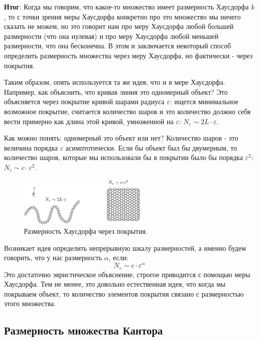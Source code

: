 \documentclass[12pt]{article}
\newcommand{\VE}{\varepsilon}
\theoremstyle{definition}
\begin{document}
\textbf{Итог}: Когда мы говорим, что какое-то множество имеет размерность Хаусдорфа $k$, то с точки зрения меры Хаусдорфа конкретно про это множество мы ничего сказать не можем, но это говорит нам про меру Хаусдорфа любой большей размерности (что она нулевая) и про меру Хаусдорфа любой меньшей размерности, что она бесконечна. В этом и заключается некоторый способ определить размерность множества через меру Хаусдорфа, но фактически - через покрытия. 

Таким образом, опять используется та же идея, что и в мере Хаусдорфа. Например, как объяснить, что кривая линия это одномерный объект? Это объясняется через покрытие кривой шарами радиуса $\VE$: ищется минимальное возможное покрытие, считается количество шаров и это количество должно себя вести примерно как длина этой кривой, умноженной на $\VE$: $N_\VE \sim 2 L{\cdot}\VE$.

Как можно понять: одномерный это объект или нет? Количество шаров - это величина порядка $\VE$ асимптотически. Если бы объект был бы двумерным, то количество шаров, которые мы использовали бы в покрытии было бы порядка $\VE^2$: $N_\VE \sim c{\cdot}\VE^2$.

\begin{figure}[H]
	\centering
	\includegraphics[width=0.55\textwidth]{MA4L15_2.png}
	\caption{Размерность Хаусдорфа через покрытия.}
	\label{15_2}
\end{figure}
Возникает идея определить непрерывную шкалу размерностей, а именно будем говорить, что у нас размерность $\alpha$, если:
$$
	N_\VE \sim c{\cdot}\VE^\alpha
$$
Это достаточно эвристическое объяснение, строгое приводится с помощью меры Хаусдорфа. Тем не менее, это довольно естественная идея, что когда мы покрываем объект, то количество элементов покрытия связано с размерностью этого множества.

\subsection*{Размерность множества Кантора}
\end{document}
